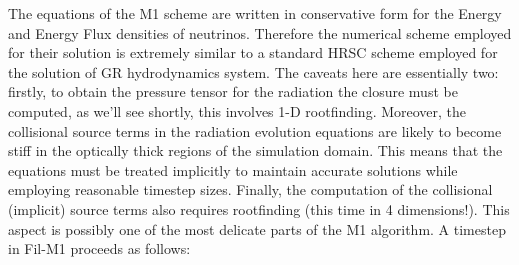 The equations of the M1 scheme are written in conservative form for the Energy and Energy Flux densities of neutrinos. Therefore the numerical scheme employed for their solution is extremely similar to a standard HRSC scheme employed for the solution of GR hydrodynamics system. The caveats here are essentially two: firstly, to obtain the pressure tensor for the radiation the closure must be computed, as we'll see shortly, this involves 1-D rootfinding. Moreover, the collisional source terms in the radiation evolution equations are likely to become stiff in the optically thick regions of the simulation domain. This means that the equations must be treated implicitly to maintain accurate solutions while employing reasonable timestep sizes. Finally, the computation of the collisional (implicit) source terms also requires rootfinding (this time in 4 dimensions!). This aspect is possibly one of the most delicate parts of the M1 algorithm.
A timestep in Fil-M1 proceeds as follows:
